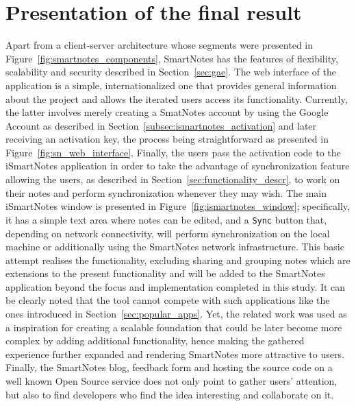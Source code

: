 \section{Presentation of the final result}\label{sec:result}
Apart from a client-server architecture whose segments were presented in Figure~\ref{fig:smartnotes_components}, SmartNotes has the features of flexibility, scalability and security described in Section~\ref{sec:gae}. The web interface of the application is a simple, internationalized one that provides general information about the project and allows the iterated users access its functionality. Currently, the latter involves merely creating a SmatNotes account by using the Google Account as described in Section~\ref{subsec:ismartnotes_activation} and later receiving an activation key, the process being straightforward as presented in Figure~\ref{fig:sn_web_interface}. Finally, the users pass the activation code to the iSmartNotes application in order to take the advantage of synchronization feature allowing the users, as described in Section~\ref{sec:functionality_descr}, to work on their notes and perform synchronization whenever they may wish. The main iSmartNotes window is presented in Figure~\ref{fig:ismartnotes_window}; specifically, it has a simple text area where notes can be edited, and a \texttt{Sync} button that, depending on network connectivity, will perform synchronization on the local machine or additionally using the SmartNotes network infrastructure. This basic attempt realises the functionality, excluding sharing and grouping notes which are extensions to the present functionality and will be added to the SmartNotes application beyond the focus and implementation completed in this study. It can be clearly noted that the tool cannot compete with such applications like the ones introduced in Section~\ref{sec:popular_apps}. Yet, the related work was used as a inspiration for creating a scalable foundation that could be later become more complex by adding additional functionality, hence making the gathered experience further expanded and rendering SmartNotes more attractive to users. Finally, the SmartNotes blog, feedback form and hosting the source code on a well known Open Source service does not only point to gather users’ attention, but also to find developers who find the idea interesting and collaborate on it. 
 
